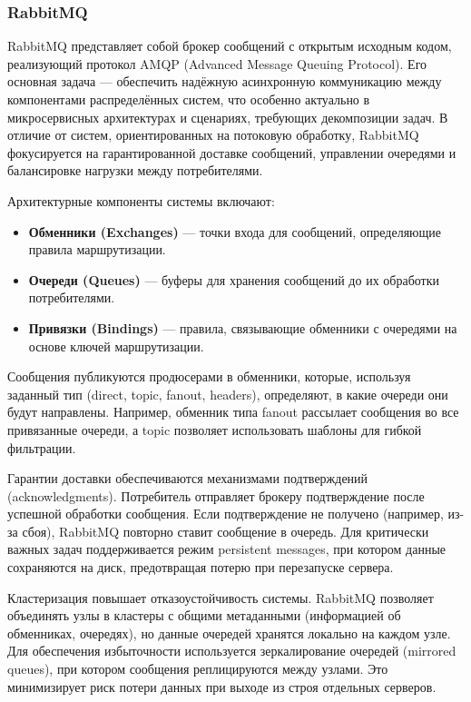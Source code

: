         \subsubsection{RabbitMQ}
            RabbitMQ представляет собой брокер сообщений с открытым исходным кодом, реализующий протокол AMQP (Advanced Message Queuing Protocol). Его основная задача — обеспечить надёжную асинхронную коммуникацию между компонентами распределённых систем, что особенно актуально в микросервисных архитектурах и сценариях, требующих декомпозиции задач. В отличие от систем, ориентированных на потоковую обработку, RabbitMQ фокусируется на гарантированной доставке сообщений, управлении очередями и балансировке нагрузки между потребителями.
            
            
            Архитектурные компоненты системы включают:
            \begin{itemize}
                \item \textbf{Обменники (Exchanges)} — точки входа для сообщений, определяющие правила маршрутизации.
                \item \textbf{Очереди (Queues)} — буферы для хранения сообщений до их обработки потребителями.
                \item \textbf{Привязки (Bindings)} — правила, связывающие обменники с очередями на основе ключей маршрутизации.
            \end{itemize}
            
            
            Сообщения публикуются продюсерами в обменники, которые, используя заданный тип (direct, topic, fanout, headers), определяют, в какие очереди они будут направлены. Например, обменник типа fanout рассылает сообщения во все привязанные очереди, а topic позволяет использовать шаблоны для гибкой фильтрации.
            
            
            Гарантии доставки обеспечиваются механизмами подтверждений (acknowledgments). Потребитель отправляет брокеру подтверждение после успешной обработки сообщения. Если подтверждение не получено (например, из-за сбоя), RabbitMQ повторно ставит сообщение в очередь. Для критически важных задач поддерживается режим persistent messages, при котором данные сохраняются на диск, предотвращая потерю при перезапуске сервера.
            
            
            Кластеризация повышает отказоустойчивость системы. RabbitMQ позволяет объединять узлы в кластеры с общими метаданными (информацией об обменниках, очередях), но данные очередей хранятся локально на каждом узле. Для обеспечения избыточности используется зеркалирование очередей (mirrored queues), при котором сообщения реплицируются между узлами. Это минимизирует риск потери данных при выходе из строя отдельных серверов.
            

